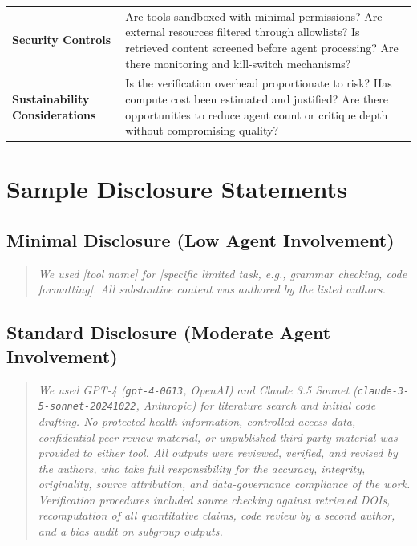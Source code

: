\documentclass[11pt,letterpaper]{article}
\begin{document}
\begin{longtable}{p{}p{}}
\textbf{Security Controls} & 
Are tools sandboxed with minimal permissions? Are external resources filtered through allowlists? Is retrieved content screened before agent processing? Are there monitoring and kill-switch mechanisms? \\

\textbf{Sustainability Considerations} & 
Is the verification overhead proportionate to risk? Has compute cost been estimated and justified? Are there opportunities to reduce agent count or critique depth without compromising quality? \\

\end{longtable}

\section{Sample Disclosure Statements}
\label{app:disclosure}

\subsection{Minimal Disclosure (Low Agent Involvement)}

\begin{quote}
\textit{We used [tool name] for [specific limited task, e.g., grammar checking, code formatting]. All substantive content was authored by the listed authors.}
\end{quote}

\subsection{Standard Disclosure (Moderate Agent Involvement)}

\begin{quote}
\textit{We used GPT-4 (\texttt{gpt-4-0613}, OpenAI) and Claude 3.5 Sonnet (\texttt{claude-3-5-sonnet-20241022}, Anthropic) for literature search and initial code drafting. No protected health information, controlled-access data, confidential peer-review material, or unpublished third-party material was provided to either tool. All outputs were reviewed, verified, and revised by the authors, who take full responsibility for the accuracy, integrity, originality, source attribution, and data-governance compliance of the work. Verification procedures included source checking against retrieved DOIs, recomputation of all quantitative claims, code review by a second author, and a bias audit on subgroup outputs.}
\end{quote}
\end{document}
